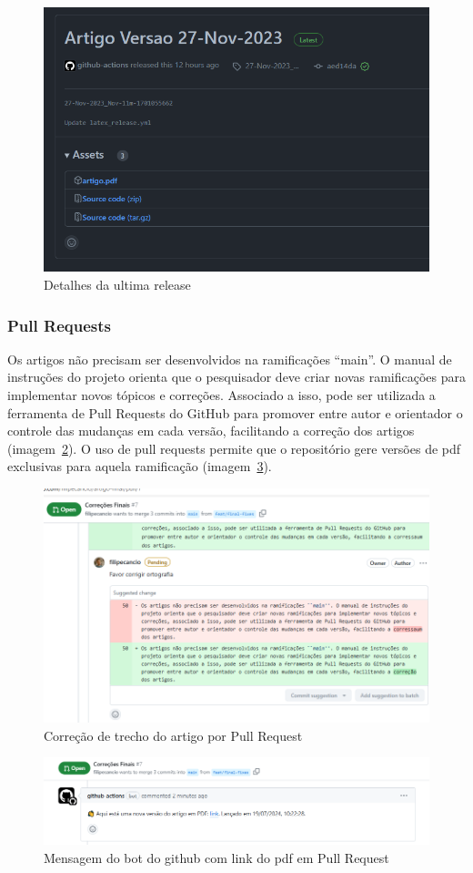 \begin{figure}[ht]
	\centering
	\includegraphics[width=.6\textwidth]{./images/fig04.png}
	\caption{Detalhes da ultima release}
	\label{fig:fig04}
\end{figure}

\subsubsection{Pull Requests}

Os artigos não precisam ser desenvolvidos na ramificações ``main''. O manual de instruções do projeto orienta que o pesquisador deve criar novas ramificações para implementar novos tópicos e correções. Associado a isso, pode ser utilizada a ferramenta de Pull Requests do GitHub para promover entre autor e orientador o controle das mudanças em cada versão, facilitando a correção dos artigos (imagem~\ref{fig:fig05}). O uso de pull requests permite que o repositório gere versões de pdf exclusivas para aquela ramificação (imagem~\ref{fig:fig06}).

\begin{figure}[ht]
	\centering
	\includegraphics[width=.6\textwidth]{./images/fig05.png}
	\caption{Correção de trecho do artigo por Pull Request}
	\label{fig:fig05}
\end{figure}

\begin{figure}[ht]
	\centering
	\includegraphics[width=.6\textwidth]{./images/fig06.png}
	\caption{Mensagem do bot do github com link do pdf em Pull Request}
	\label{fig:fig06}
\end{figure}


